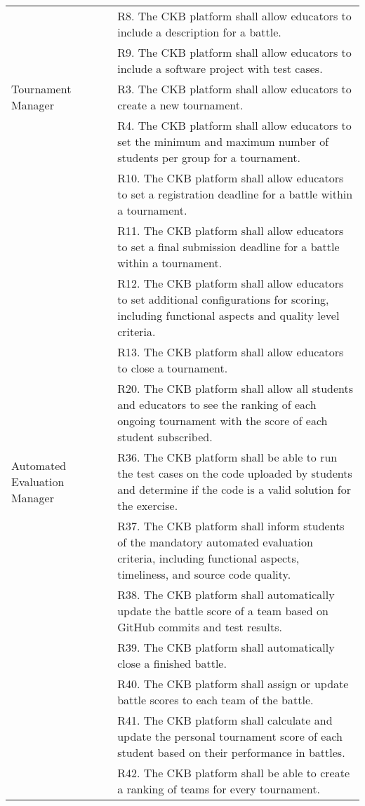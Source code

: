 \begin{center}
\begin{longtable}{p{0.3\linewidth}p{0.7\linewidth}}
        & R8. The CKB platform shall allow educators to include a description for a battle. \\
        & R9. The CKB platform shall allow educators to include a software project with test cases. \\
        \hline
        Tournament Manager & R3. The CKB platform shall allow educators to create a new tournament. \\
        & R4. The CKB platform shall allow educators to set the minimum and maximum number of students per group for a tournament. \\
        & R10. The CKB platform shall allow educators to set a registration deadline for a battle within a tournament. \\
        & R11. The CKB platform shall allow educators to set a final submission deadline for a battle within a tournament. \\
        & R12. The CKB platform shall allow educators to set additional configurations for scoring, including functional aspects and quality level criteria. \\
        & R13. The CKB platform shall allow educators to close a tournament. \\
        & R20. The CKB platform shall allow all students and educators to see the ranking of each ongoing tournament with the score of each student subscribed. \\
        \hline
        Automated Evaluation Manager & R36. The CKB platform shall be able to run the test cases on the code uploaded by students and determine if the code is a valid solution for the exercise. \\
        & R37. The CKB platform shall inform students of the mandatory automated evaluation criteria, including functional aspects, timeliness, and source code quality. \\
        & R38. The CKB platform shall automatically update the battle score of a team based on GitHub commits and test results. \\
        & R39. The CKB platform shall automatically close a finished battle. \\
        & R40. The CKB platform shall assign or update battle scores to each team of the battle. \\
        & R41. The CKB platform shall calculate and update the personal tournament score of each student based on their performance in battles. \\
        & R42. The CKB platform shall be able to create a ranking of teams for every tournament. \\

\end{longtable}
\end{center}
